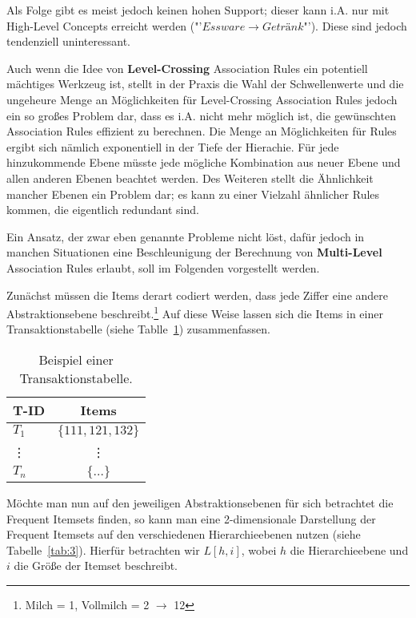 Als Folge gibt es meist jedoch keinen hohen Support; dieser kann i.A. nur mit
High-Level Concepts erreicht werden ("'\(Essware \longrightarrow Getränk\)"').
Diese sind jedoch tendenziell uninteressant.

Auch wenn die Idee von \textbf{Level-Crossing} Association Rules ein potentiell mächtiges
Werkzeug ist, stellt
in der Praxis die Wahl der Schwellenwerte und die ungeheure Menge an
Möglichkeiten für Level-Crossing Association Rules jedoch ein so großes Problem
dar, dass es i.A. nicht mehr möglich ist, die gewünschten Association Rules
effizient zu berechnen. Die Menge an Möglichkeiten für Rules ergibt sich nämlich
exponentiell in der Tiefe der Hierachie. Für jede hinzukommende Ebene müsste jede
mögliche Kombination aus neuer Ebene und allen anderen Ebenen beachtet werden.
Des Weiteren stellt die Ähnlichkeit mancher Ebenen ein Problem dar; es kann zu einer
Vielzahl ähnlicher Rules kommen, die eigentlich redundant sind.

Ein Ansatz, der zwar eben genannte Probleme nicht löst, dafür jedoch in manchen
Situationen eine Beschleunigung der Berechnung von \textbf{Multi-Level} Association
Rules erlaubt, soll im Folgenden vorgestellt werden.

Zunächst müssen die Items derart codiert werden, dass jede Ziffer eine andere
Abstraktionsebene beschreibt.\footnote{Milch = 1, Vollmilch = 2 \(\longrightarrow\) 12}
Auf diese Weise lassen sich die Items in einer Transaktionstabelle (siehe 
Tablle~\ref{tab:transaction}) zusammenfassen.

\begin{table}[tbh]
	\centering
	\caption{Beispiel einer Transaktionstabelle.}
	\label{tab:transaction}
	\begin{tabular}{lc}
		\toprule
		\textbf{T-ID} & \textbf{Items}\\
		\midrule
		\(T_1\)	& \(\{111, 121, 132\}\)\\
		\vdots 	& \vdots\\
		\(T_n\)	& \(\{\dots\}\)\\
		\bottomrule
	\end{tabular}
\end{table}

Möchte man nun auf den jeweiligen Abstraktionsebenen für sich betrachtet die
Frequent Itemsets finden, so kann man eine 2-dimensionale Darstellung der Frequent Itemsets
auf den verschiedenen Hierarchieebenen
nutzen (siehe Tabelle~\ref{tab:3}). Hierfür betrachten wir \(L[h,i]\), wobei 
\(h\) die Hierarchieebene und \(i\) die Größe der Itemset  beschreibt.

